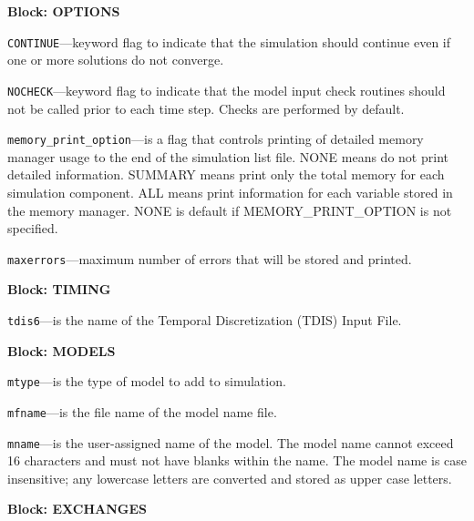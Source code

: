 
\item \textbf{Block: OPTIONS}

\begin{description}
\item \texttt{CONTINUE}---keyword flag to indicate that the simulation should continue even if one or more solutions do not converge.

\item \texttt{NOCHECK}---keyword flag to indicate that the model input check routines should not be called prior to each time step. Checks are performed by default.

\item \texttt{memory\_print\_option}---is a flag that controls printing of detailed memory manager usage to the end of the simulation list file.  NONE means do not print detailed information. SUMMARY means print only the total memory for each simulation component. ALL means print information for each variable stored in the memory manager. NONE is default if MEMORY\_PRINT\_OPTION is not specified.

\item \texttt{maxerrors}---maximum number of errors that will be stored and printed.

\end{description}
\item \textbf{Block: TIMING}

\begin{description}
\item \texttt{tdis6}---is the name of the Temporal Discretization (TDIS) Input File.

\end{description}
\item \textbf{Block: MODELS}

\begin{description}
\item \texttt{mtype}---is the type of model to add to simulation.

\item \texttt{mfname}---is the file name of the model name file.

\item \texttt{mname}---is the user-assigned name of the model.  The model name cannot exceed 16 characters and must not have blanks within the name.  The model name is case insensitive; any lowercase letters are converted and stored as upper case letters.

\end{description}
\item \textbf{Block: EXCHANGES}

